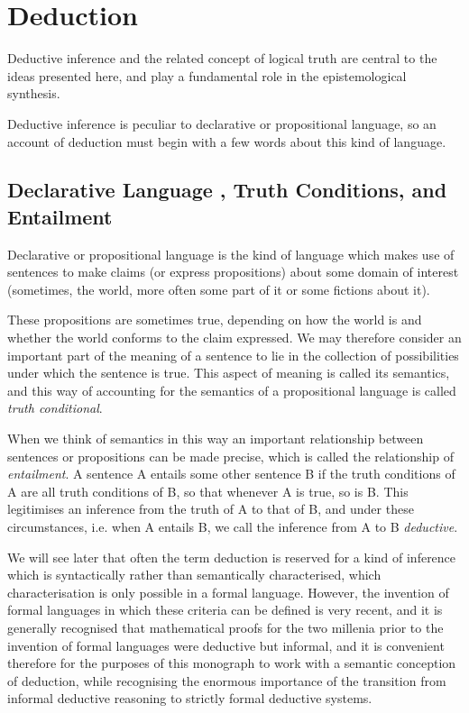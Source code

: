 \documentclass[10pt,titlepage]{book}
\begin{document}
\chapter{Deduction}

Deductive inference and the related concept of logical truth are central to the ideas presented here, and play a fundamental role in the epistemological synthesis.

Deductive inference is peculiar to declarative or propositional language, so an account of deduction must begin with a few words about this kind of language.

\section{Declarative Language , Truth Conditions, and Entailment}

Declarative or propositional language is the kind of language which makes use of sentences to make claims (or express propositions) about some domain of interest (sometimes, the world, more often some part of it or some fictions about it).

These propositions are sometimes true, depending on how the world is and whether the world conforms to the claim expressed.
We may therefore consider an important part of the meaning of a sentence to lie in the collection of possibilities under which the sentence is true.
This aspect of meaning is called its semantics, and this way of accounting for the semantics of a propositional language is called \emph{truth conditional}.

When we think of semantics in this way an important relationship between sentences or propositions can be made precise, which is called the relationship of \emph{entailment}.
A sentence A entails some other sentence B if the truth conditions of A are all truth conditions of B, so that whenever A is true, so is B.
This legitimises an inference from the truth of A to that of B, and under these circumstances, i.e. when A entails B, we call the inference from A to B \emph{deductive}.

We will see later that often the term deduction is reserved for a kind of inference which is syntactically rather than semantically characterised, which characterisation is only possible in a formal language.
However, the invention of formal languages in which these criteria can be defined is very recent, and it is generally recognised that mathematical proofs for the two millenia prior to the invention of formal languages were deductive but informal, and it is convenient therefore for the purposes of this monograph to work with a semantic conception of deduction, while recognising the enormous importance of the transition from informal deductive reasoning to strictly formal deductive systems.
\end{document}

